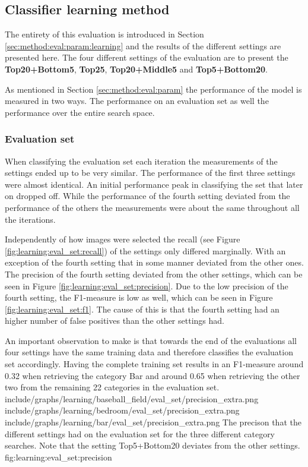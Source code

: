 
\subsection{Classifier learning method}
\label{sec:res:learning}

The entirety of this evaluation is introduced in Section \ref{sec:method:eval:param:learning} and the results of the different settings are presented here. 
The four different settings of the evaluation are to present the \textbf{Top20+Bottom5}, \textbf{Top25}, \textbf{Top20+Middle5} and \textbf{Top5+Bottom20}.

As mentioned in Section \ref{sec:method:eval:param} the performance of the model is measured in two ways. The performance on an evaluation set as well the performance over the entire search space.

\subsubsection{Evaluation set}
\label{sec:res:learning:eval}
When classifying the evaluation set each iteration the measurements of the settings ended up to be very similar. The performance of the first three settings were almost identical. An initial performance peak in classifying the set that later on dropped off. While the performance of the fourth setting deviated from the performance of the others the measurements were about the same throughout all the iterations.

Independently of how images were selected the recall (see Figure \ref{fig:learning:eval_set:recall}) of the settings only differed marginally. With an exception of the fourth setting that in some manner deviated from the other ones. 
The precision of the fourth setting deviated from the other settings, which can be seen in Figure \ref{fig:learning:eval_set:precision}. Due to the low precision of the fourth setting, the F1-measure is low as well, which can be seen in Figure \ref{fig:learning:eval_set:f1}. The cause of this is that the fourth setting had an higher number of false positives than the other settings had.

An important observation to make is that towards the end of the evaluations all four settings have the same training data and therefore classifies the evaluation set accordingly. Having the complete training set results in an F1-measure around 0.32 when retrieving the category Bar and around 0.65 when retrieving the other two from the remaining 22 categories in the evaluation set.
\tripfigurenear
{include/graphs/learning/baseball_field/eval_set/precision_extra.png}
{include/graphs/learning/bedroom/eval_set/precision_extra.png}
{include/graphs/learning/bar/eval_set/precision_extra.png}
{The precison that the different settings had on the evaluation set for the three different category searches. Note that the setting Top5+Bottom20 deviates from the other settings.}
{fig:learning:eval_set:precision}

